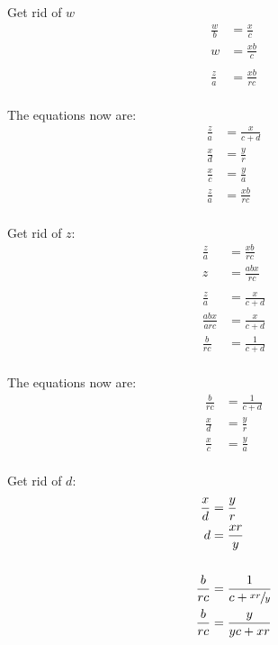 \documentclass{exam}
\begin{document}
\begin{description}
      Get rid of $w$
      \begin{align*}
        \frac{w}{b} & = \frac{x}{c} \\
        w           & = \frac{xb}{c} \\
        \\
        \frac{z}{a} & = \frac{xb}{rc} \\
      \end{align*}

      The equations now are:
      \begin{align*}
        \frac{z}{a} & = \frac{x}{c + d} \\
        \frac{x}{d} & = \frac{y}{r} \\
        \frac{x}{c} & = \frac{y}{a} \\
        \frac{z}{a} & = \frac{xb}{rc} \\
      \end{align*}

      Get rid of $z$:
      \begin{align*}
        \frac{z}{a}     & = \frac{xb}{rc} \\
        z               & = \frac{abx}{rc} \\
        \\
        \frac{z}{a}     & = \frac{x}{c + d} \\
        \frac{abx}{arc} & = \frac{x}{c + d} \\
        \frac{b}{rc}    & = \frac{1}{c + d} \\
      \end{align*}

      The equations now are:
      \begin{align*}
        \frac{b}{rc} & = \frac{1}{c + d} \\
        \frac{x}{d}  & = \frac{y}{r} \\
        \frac{x}{c}  & = \frac{y}{a} \\
      \end{align*}

      Get rid of $d$:
      \begin{align*}
        \frac{x}{d}  & = \frac{y}{r} \\
        d            & = \frac{xr}{y} \\
        \\
        \frac{b}{rc} & = \frac{1}{c + \sfrac{xr}{y}} \\
        \frac{b}{rc} & = \frac{y}{yc + xr} \\
      \end{align*}


\end{description}
\end{document}
